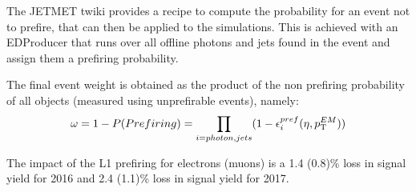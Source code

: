 The JETMET twiki provides a recipe to compute the probability for an event not to prefire, that can then be applied to the simulations. This is achieved with an EDProducer that runs over all offline photons and jets found in the event and assign them a prefiring probability. 

The final event weight is obtained as the product of the non prefiring probability of all objects (measured using unprefirable events), namely:
\begin{equation}
	\omega = 1 - P(Prefiring) = \prod_{i=photon,jets}(1-\epsilon_i^{pref}(\eta,p_{\mathrm{T}}^{EM}))
\end{equation}

The impact of the L1 prefiring for electrons (muons) is a 1.4 (0.8)\% 
loss in signal yield for 2016 and 2.4 (1.1)\% 
loss in signal yield for 2017.

